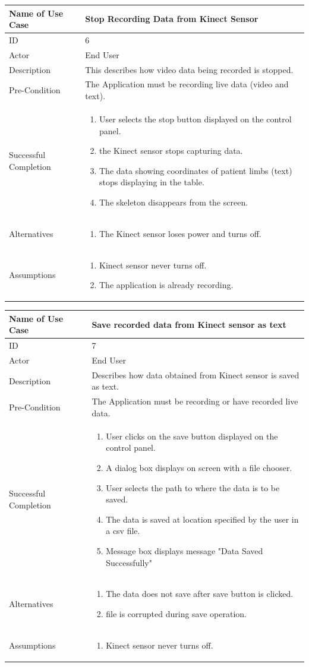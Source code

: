 \documentclass[a4paper, 12pt]{article}
\newcommand\addrow[2]{#1 &#2\\ }
\newcommand\addheading[2]{#1 &#2\\ \hline}
\newcommand\tabularhead{\begin{tabular}{lp{8cm}}
\hline
}
\newcommand\addmulrow[2]{ \begin{minipage}[t][][t]{2.5cm}#1\end{minipage}%
   &\begin{minipage}[t][][t]{8cm}
    \begin{enumerate} #2   \end{enumerate}
    \end{minipage}\\ }
\newenvironment{usecase}{\tabularhead}
{\hline\end{tabular}}
\begin{document}
\begin{usecase}
	\addheading{Name of Use Case}{Stop Recording Data from Kinect Sensor}
	\addrow{ID}{6}
	\addrow{Actor}{End User}
	\addrow{Description}{This describes how video data being recorded is stopped.}
	\addrow{Pre-Condition}{The Application must be recording live data (video and text).}
	\addmulrow{Successful Completion}{
		\item User selects the stop button displayed on the control panel. 
		\item the Kinect sensor stops capturing data.
		\item The data showing coordinates of patient limbs (text) stops displaying in the table. 
		\item The skeleton disappears from the screen.}
	\addmulrow{Alternatives}{ 
	\item The Kinect sensor loses power and turns off.}
	\addmulrow{Assumptions}{
	\item Kinect sensor never turns off. 
	\item The application is already recording.}
\end{usecase}

\begin{usecase}
	\addheading{Name of Use Case}{Save recorded data from Kinect sensor as text }
	\addrow{ID}{7}
	\addrow{Actor}{End User}
	\addrow{Description}{Describes how data obtained from Kinect sensor is saved as text.}
	\addrow{Pre-Condition}{The Application must be recording or have recorded live data.}
	\addmulrow{Successful Completion}{
		\item User clicks on the save button displayed on the control panel. 
		\item A dialog box displays on screen with a file chooser. 
		\item User selects the path to where the data is to be saved.
		\item The data is saved at location specified by the user in a csv file.
		\item Message box displays message "Data Saved Successfully"}
	\addmulrow{Alternatives}{ 
	\item The data does not save after save button is clicked.
	\item file is corrupted during save operation.}
	\addmulrow{Assumptions}{
	\item Kinect sensor never turns off. }
\end{usecase}
\end{document}
